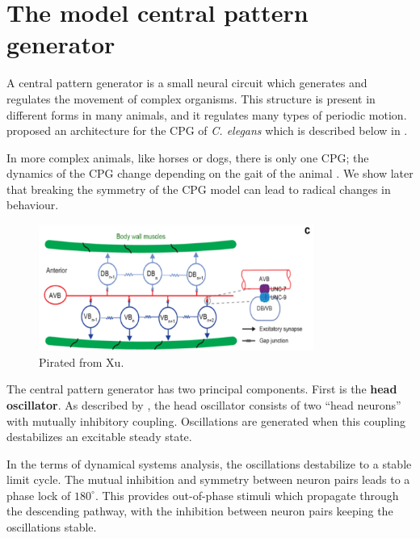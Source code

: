 \documentclass[
    11pt,
]{article}
\begin{document}
\section{The model central pattern generator}


A central pattern generator is a small neural circuit which generates and regulates the movement of complex organisms.  This structure is present in different forms in many animals, and it regulates many types of periodic motion.  \citet{xu2018} proposed an architecture for the CPG of \emph{C. elegans} which is described below in .

In more complex animals, like horses or dogs, there is only one CPG; the dynamics of the CPG change depending on the gait of the animal \citep{collins1994}.  We show later that breaking the symmetry of the CPG model can lead to radical changes in behaviour.

\begin{figure}[h!]
    \label{fig: xu_cpg}
    \centering
    \includegraphics[width=9cm]{figures/xu_cpg/xu_cpg.png}
    \caption{Pirated from Xu.}
\end{figure}

The central pattern generator has two principal components.  First is the \textbf{head oscillator}. As described by \citet{gjorgjieva2014}, the head oscillator consists of two “head neurons” with mutually inhibitory coupling.  Oscillations are generated when this coupling destabilizes an excitable steady state.

In the terms of dynamical systems analysis, the oscillations destabilize to a stable limit cycle.  The mutual inhibition and symmetry between neuron pairs leads to a phase lock of $180^\circ$.  This provides out-of-phase stimuli which propagate through the descending pathway, with the inhibition between neuron pairs keeping the oscillations stable.
\end{document}
